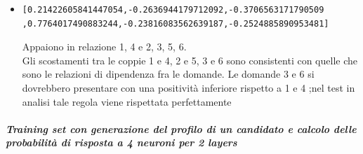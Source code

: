 \documentclass[10pt,a4paper]{article}
\begin{document}
\begin{itemize}
\item \begin{verbatim}[0.21422605841447054,-0.2636944179712092,-0.3706563171790509
,0.7764017490883244,-0.23816083562639187,-0.2524885890953481]\end{verbatim}
Appaiono in relazione 1, 4 e 2, 3, 5, 6.\\
Gli scostamenti tra le coppie  1 e 4, 2 e 5, 3 e 6 sono consistenti con quelle che sono le relazioni di dipendenza fra le domande.
Le domande 3 e 6 si dovrebbero presentare con una positivit\`a inferiore rispetto a 1 e 4 ;nel test in analisi tale regola viene rispettata perfettamente

\end{itemize}


\subparagraph{Training set con generazione del profilo di un candidato e calcolo delle probabilit\`a di risposta a 4 neuroni per 2 layers}\mbox{}
\label{Training set con generazione del profilo di un candidato e calcolo delle probabilita di risposta a 4 neuroni}
\\
\end{document}

